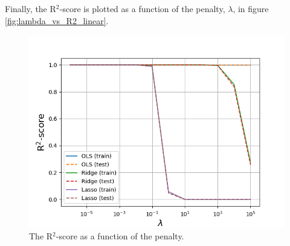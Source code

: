 Finally, the R$^2$-score is plotted as a function of the penalty, $\lambda$, in figure \eqref{fig:lambda_vs_R2_linear}.
\begin{figure} [H]
	\centering
	\includegraphics[scale=0.65]{../plots/lambda_vs_R2_linear.png}
	\caption{The R$^2$-score as a function of the penalty. }
	\label{fig:lambda_vs_R2_linear}
\end{figure} 

